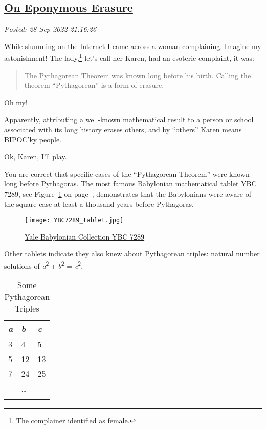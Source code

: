 %

\subsection*{\href{https://analyzethedatanotthedrivel.org/2022/09/28/on-eponymous-erasure/}{On Eponymous Erasure}}


\noindent\emph{Posted: 28 Sep 2022 21:16:26}
\vspace{6pt}

While slumming on the Internet I came across a woman complaining.
Imagine my astonishment! The
lady,\footnote{The complainer identified as female.}
let's call her Karen, had an esoteric complaint, it was:

\begin{quote}
The Pythagorean Theorem was known long before his birth. Calling the
theorem ``Pythagorean'' is a form of erasure.
\end{quote}

Oh my!

Apparently, attributing a well-known mathematical result to a person or
school associated with its long history erases others, and by
``others'' Karen means BIPOC'ky people.

Ok, Karen, I'll play.

You are correct that specific cases of the ``Pythagorean Theorem'' were
known long before Pythagoras. The most famous Babylonian mathematical
tablet YBC 7289, see Figure~\ref{fig:7510x0} on page~\pageref{fig:7510x0}, demonstrates that the Babylonians were aware
of the square case at least a thousand years before Pythagoras.

\captionsetup[figure]{labelformat=default}
\begin{figure}
\centering
\href{https://www.maa.org/press/periodicals/convergence/the-best-known-old-babylonian-tablet}{\texttt{[image: YBC7289\_tablet.jpg]}}
\caption{\href{https://isaw.nyu.edu/exhibitions/before-pythagoras/items/ybc-7289/}{Yale
Babylonian Collection YBC 7289}}
\label{fig:7510x0}
\end{figure}

Other tablets indicate they also knew about Pythagorean triples: natural
number solutions of {\emph{a}\textsuperscript{2} + \emph{b}\textsuperscript{2} = \emph{c}\textsuperscript{2}}.

\begin{longtable}[]{@{}lll@{}}
\toprule
\emph{a} & \emph{b} & \emph{c} \\
\midrule
\endhead
3 & 4 & 5 \\
5 & 12 & 13 \\
7 & 24 & 25 \\
& \ldots{} & \\
\bottomrule
\caption{Some Pythagorean Triples}
\label{tab:7510x0}
\end{longtable}

